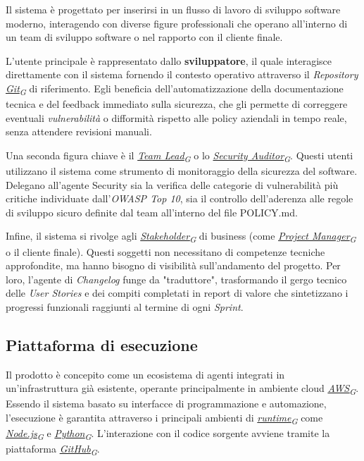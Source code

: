 \documentclass[12pt, a4paper]{article}
\newcommand{\urlglossario}{https://skynetunigroup.github.io/Code_Guardian/Documentazione/PB/glossario_v2.0.0.pdf} %
\newcommand{\glo}[2]{\href{\urlglossario\#nameddest=#2}{#1\textsubscript{G}}}
\begin{document}
Il sistema è progettato per inserirsi in un flusso di lavoro di sviluppo
software moderno, interagendo con diverse figure professionali che
operano all'interno di un team di sviluppo software o nel rapporto con il
cliente finale.

L'utente principale è rappresentato dallo \textbf{sviluppatore}, il quale interagisce direttamente con il sistema fornendo il contesto operativo attraverso il \textit{Repository} \textit{\glo{Git}{git}} di riferimento. Egli beneficia dell'automatizzazione della documentazione tecnica e del feedback immediato sulla sicurezza, che gli permette di correggere eventuali \textit{vulnerabilità} o difformità rispetto alle policy aziendali in tempo reale, senza attendere revisioni manuali. 

Una seconda figura chiave è il \textit{\glo{Team Lead}{team-lead}} o lo \textit{\glo{Security Auditor}{security-auditor}}. Questi utenti utilizzano il sistema come strumento di monitoraggio della sicurezza del software. Delegano all’agente Security sia la verifica delle categorie di vulnerabilità più critiche individuate dall’\textit{OWASP Top 10}, sia il controllo dell’aderenza alle regole di sviluppo sicuro definite dal team all’interno del file POLICY.md.

Infine, il sistema si rivolge agli \textit{\glo{Stakeholder}{stakeholder}} di business (come \textit{\glo{Project Manager}{project-manager}} o il cliente finale). Questi soggetti non necessitano di competenze tecniche approfondite, ma hanno bisogno di visibilità sull'andamento del progetto. Per loro, l'agente di \textit{Changelog} funge da "traduttore", trasformando il gergo tecnico delle \textit{User Stories} e dei compiti completati in report di valore che sintetizzano i progressi funzionali raggiunti al termine di ogni \textit{Sprint}.

\subsection{Piattaforma di esecuzione}

Il prodotto è concepito come un ecosistema di agenti integrati in
un'infrastruttura già esistente, operante principalmente
in ambiente cloud \textit{\glo{AWS}{aws}}. Essendo il sistema basato su interfacce
di programmazione e automazione, l'esecuzione è
garantita attraverso i principali ambienti di \textit{\glo{runtime}{runtime}} come
\textit{\glo{Node.js}{node-js}} e \textit{\glo{Python}{python}}.
L'interazione con il codice sorgente avviene tramite la piattaforma \textit{\glo{GitHub}{github}}. 
\newpage
\end{document}
